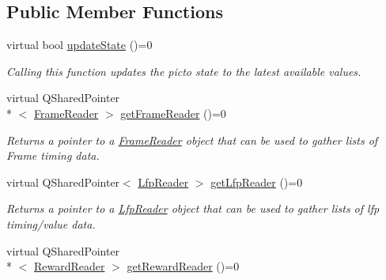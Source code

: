 \subsection*{Public Member Functions}
\begin{DoxyCompactItemize}
\item 
virtual bool \hyperlink{class_picto_1_1_state_updater_a7554cc46eafbee58fb566edd93d5410e}{update\-State} ()=0
\begin{DoxyCompactList}\small\item\em Calling this function updates the picto state to the latest available values. \end{DoxyCompactList}\item 
\hypertarget{class_picto_1_1_state_updater_a67b81a5e1902c5adca7e645b75c1fe37}{virtual Q\-Shared\-Pointer\\*
$<$ \hyperlink{class_picto_1_1_frame_reader}{Frame\-Reader} $>$ \hyperlink{class_picto_1_1_state_updater_a67b81a5e1902c5adca7e645b75c1fe37}{get\-Frame\-Reader} ()=0}\label{class_picto_1_1_state_updater_a67b81a5e1902c5adca7e645b75c1fe37}

\begin{DoxyCompactList}\small\item\em Returns a pointer to a \hyperlink{class_picto_1_1_frame_reader}{Frame\-Reader} object that can be used to gather lists of Frame timing data. \end{DoxyCompactList}\item 
\hypertarget{class_picto_1_1_state_updater_a3801d9fb88b55f5974079312a81d1ec2}{virtual Q\-Shared\-Pointer$<$ \hyperlink{class_picto_1_1_lfp_reader}{Lfp\-Reader} $>$ \hyperlink{class_picto_1_1_state_updater_a3801d9fb88b55f5974079312a81d1ec2}{get\-Lfp\-Reader} ()=0}\label{class_picto_1_1_state_updater_a3801d9fb88b55f5974079312a81d1ec2}

\begin{DoxyCompactList}\small\item\em Returns a pointer to a \hyperlink{class_picto_1_1_lfp_reader}{Lfp\-Reader} object that can be used to gather lists of lfp timing/value data. \end{DoxyCompactList}\item 
\hypertarget{class_picto_1_1_state_updater_a7dc223816c274f80b0082b9ebf8e4a19}{virtual Q\-Shared\-Pointer\\*
$<$ \hyperlink{class_picto_1_1_reward_reader}{Reward\-Reader} $>$ \hyperlink{class_picto_1_1_state_updater_a7dc223816c274f80b0082b9ebf8e4a19}{get\-Reward\-Reader} ()=0}\label{class_picto_1_1_state_updater_a7dc223816c274f80b0082b9ebf8e4a19}


\end{DoxyCompactItemize}
